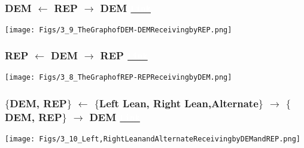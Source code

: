 \documentclass{beamer}
\begin{document}
\begin{frame}
\frametitle{DEM $\leftarrow$ REP $\rightarrow$ DEM  \phantom{This text will be invisibleeee} \href{http://politicalnets.com/view/ddrr}{\texttt{\textcolor{white}{Link}}}}

\begin{center}
\texttt{[image: Figs/3\_9\_TheGraphofDEM-DEMReceivingbyREP.png]} \hspace*{4cm}
\end{center}

\end{frame}


\begin{frame}
\frametitle{REP $\leftarrow$ DEM $\rightarrow$ REP  \phantom{This text will be invi} \href{http://politicalnets.com/view/rrrd}{\texttt{\textcolor{white}{Link}}}}

\begin{center}
\texttt{[image: Figs/3\_8\_TheGraphofREP-REPReceivingbyDEM.png]} \hspace*{4cm}
\end{center}

\end{frame}



\begin{frame}
\frametitle{\small $\{$DEM, REP$\}$ $\leftarrow$ $\{$Left Lean, Right Lean,Alternate$\}$ $\rightarrow$ $\{$DEM, REP$\}$   $\rightarrow$ DEM  \phantom{This text will be invisibleeeeThis text will be invisibleeeenvisibleeeeeeeee} \href{http://politicalnets.com/view/rother}{\texttt{\textcolor{white}{Link}}}}

\begin{center}
\texttt{[image: Figs/3\_10\_Left,RightLeanandAlternateReceivingbyDEMandREP.png]} \hspace*{4cm}
\end{center}

\end{frame}
\end{document}
